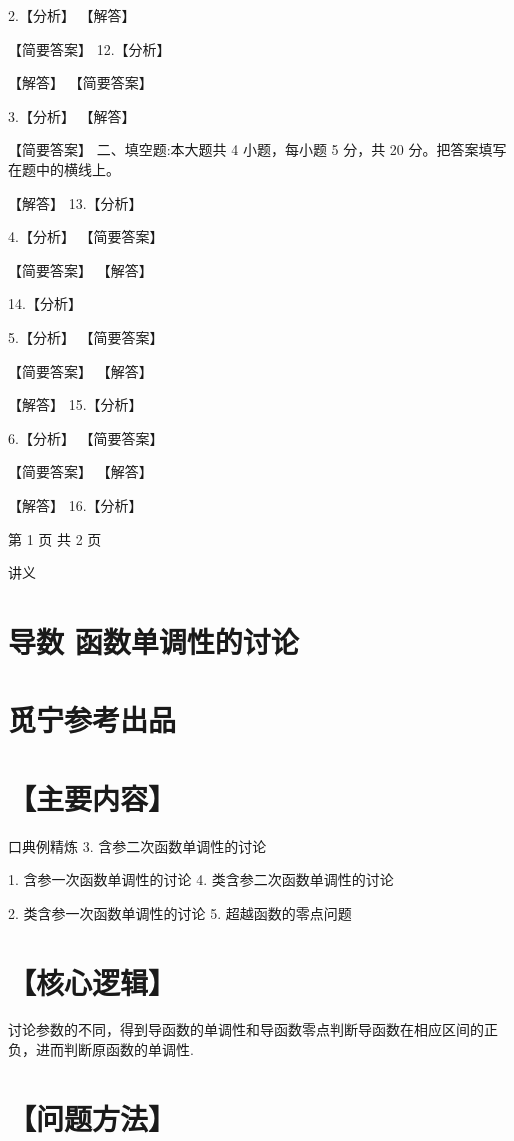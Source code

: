 \documentclass[10pt]{article}
\begin{document}
2.【分析】 【解答】

【简要答案】 12.【分析】

【解答】 【简要答案】

3.【分析】 【解答】

【简要答案】 二、填空题:本大题共 4 小题，每小题 5 分，共 20 分。把答案填写在题中的横线上。

【解答】 13.【分析】

4.【分析】 【简要答案】

【简要答案】 【解答】

14.【分析】

5.【分析】 【简要答案】

【简要答案】 【解答】

【解答】 15.【分析】

6.【分析】 【简要答案】

【简要答案】 【解答】

【解答】 16.【分析】

第 1 页 共 2 页

讲义

\section*{导数 函数单调性的讨论}

\section*{觅宁参考出品}

\section*{【主要内容】}

口典例精炼 3. 含参二次函数单调性的讨论

1. 含参一次函数单调性的讨论 4. 类含参二次函数单调性的讨论

2. 类含参一次函数单调性的讨论 5. 超越函数的零点问题

\section*{【核心逻辑】}

讨论参数的不同，得到导函数的单调性和导函数零点判断导函数在相应区间的正负，进而判断原函数的单调性.

\section*{【问题方法】}
\end{document}
